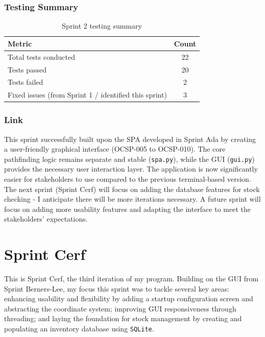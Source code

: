 \subsubsection{Testing Summary}
\begin{table}[htbp]
	\centering
	\begin{tabular}{|l|c|}
		\hline
		\textbf{Metric} & \textbf{Count} \\
		\hline
		Total tests conducted & 22 \\ %
		\hline
		Tests passed & 20 \\ %
		\hline
		Tests failed & 2 \\ %
		\hline
		Fixed issues (from Sprint 1 / identified this sprint) & 3 \\ %
		\hline
	\end{tabular}
	\caption{Sprint 2 testing summary}
\end{table}


\subsubsection{Link}
This sprint successfully built upon the SPA developed in Sprint Ada by creating a user-friendly graphical interface (OCSP-005 to OCSP-010). The core pathfinding logic remains separate and stable (\verb|spa.py|), while the GUI (\verb|gui.py|) provides the necessary user interaction layer. The application is now significantly easier for stakeholders to use compared to the previous terminal-based version. The next sprint (Sprint Cerf) will focus on adding the database features for stock checking - I anticipate there will be more iterations necessary. A future sprint will focus on adding more usability features and adapting the interface to meet the stakeholders' expectations.

\newpage


\section{Sprint Cerf}

This is Sprint Cerf, the third iteration of my program. Building on the GUI from Sprint Berners-Lee, my focus this sprint was to tackle several key areas: enhancing usability and flexibility by adding a startup configuration screen and abstracting the coordinate system; improving GUI responsiveness through threading; and laying the foundation for stock management by creating and populating an inventory database using \texttt{SQLite}.

